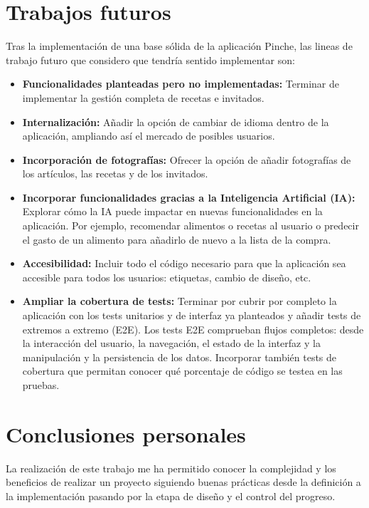 \section{Trabajos futuros}
\label{sec:trabajos-futuros}

Tras la implementación de una base sólida de la aplicación Pinche, las lineas de trabajo futuro que considero que tendría sentido implementar son:

\begin{itemize}
    \item \textbf{Funcionalidades planteadas pero no implementadas:} Terminar de implementar la gestión completa de recetas e invitados.
    \item \textbf{Internalización:} Añadir la opción de cambiar de idioma dentro de la aplicación, ampliando así el mercado de posibles usuarios.
    \item \textbf{Incorporación de fotografías:} Ofrecer la opción de añadir fotografías de los artículos, las recetas y de los invitados.
    \item \textbf{Incorporar funcionalidades gracias a la Inteligencia Artificial (IA):} Explorar cómo la IA puede impactar en nuevas funcionalidades en la aplicación. Por ejemplo, recomendar alimentos o recetas al usuario o predecir el gasto de un alimento para añadirlo de nuevo a la lista de la compra.
    \item \textbf{Accesibilidad:} Incluir todo el código necesario para que la aplicación sea accesible para todos los usuarios: etiquetas, cambio de diseño, etc.
    \item \textbf{Ampliar la cobertura de tests:} Terminar por cubrir por completo la aplicación con los tests unitarios y de interfaz ya planteados y añadir tests de extremos a extremo (E2E). Los tests E2E comprueban flujos completos: desde la interacción del usuario, la navegación, el estado de la interfaz y la manipulación y la persistencia de los datos. Incorporar también tests de cobertura que permitan conocer qué porcentaje de código se testea en las pruebas.
\end{itemize}

\section{Conclusiones personales}
\label{sec:conclusiones-personales}

La realización de este trabajo me ha permitido conocer la complejidad y los beneficios de realizar un proyecto siguiendo buenas prácticas desde la definición a la implementación pasando por la etapa de diseño y el control del progreso.

